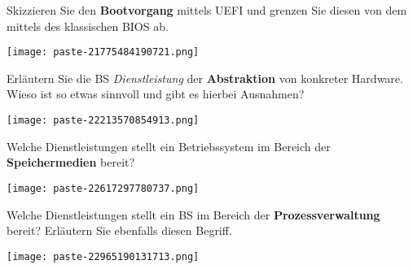 \documentclass{article}
\begin{document}
\begin{tcolorbox}[colback=white!10!white,colframe=lightgray!75!black,
  savelowerto=\jobname_ex.tex]

\begin{center}
Skizzieren Sie den 
\textbf{Bootvorgang
} mittels UEFI und grenzen Sie diesen von dem mittels des klassischen BIOS ab.

\end{center}

\tcblower

\justifying
\texttt{[image: paste-21775484190721.png]}

\end{tcolorbox}
\begin{tcolorbox}[colback=white!10!white,colframe=lightgray!75!black,
  savelowerto=\jobname_ex.tex]

\begin{center}
Erläutern Sie die BS
\textit{Dienstleistung
}der 
\textbf{Abstraktion
}von konkreter Hardware. Wieso ist so etwas sinnvoll und gibt es hierbei Ausnahmen?

\end{center}

\tcblower

\justifying
\texttt{[image: paste-22213570854913.png]}

\end{tcolorbox}
\begin{tcolorbox}[colback=white!10!white,colframe=lightgray!75!black,
  savelowerto=\jobname_ex.tex]

\begin{center}
Welche Dienstleistungen stellt ein Betriebssystem im Bereich der 
\textbf{Speichermedien
} bereit?

\end{center}

\tcblower

\justifying
\texttt{[image: paste-22617297780737.png]}

\end{tcolorbox}
\begin{tcolorbox}[colback=white!10!white,colframe=lightgray!75!black,
  savelowerto=\jobname_ex.tex]

\begin{center}
Welche Dienstleistungen stellt ein BS im Bereich der 
\textbf{Prozessverwaltung
}bereit? Erläutern Sie ebenfalls diesen Begriff.

\end{center}

\tcblower

\justifying
\texttt{[image: paste-22965190131713.png]}

\end{tcolorbox}
\end{document}
